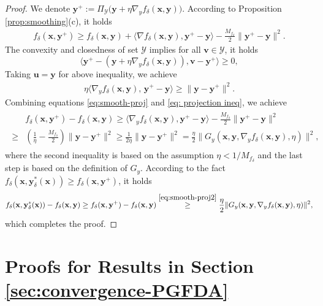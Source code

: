 \documentclass[11pt]{article}
\def\vu{\mathbf{u}}
\def\vv{\mathbf{v}}
\def\vx{\mathbf{x}}
\def\vy{\mathbf{y}}
\def\fY{{\mathcal{Y}}}
\begin{document}
\begin{proof}
We denote $\vy^+ := \Pi_{\mathcal Y}\bigl(\vy+\eta\nabla_y f_\delta(\vx,\vy)\bigr)$.
According to Proposition \ref{prop:smoothing}(c), it holds
\begin{align}\label{eq:smooth-proj}
f_\delta(\vx,\vy^+)\ge f_\delta(\vx,\vy)+\langle \nabla f_\delta(\vx,\vy),\vy^+-\vy\rangle-\frac{M_{f_\delta}}{2}\|\vy^+-\vy\|^2.    
\end{align}
The convexity and closedness of set $\fY$ implies for all $\vv\in\fY$, it holds
\begin{equation*}
\bigl\langle \vy^+ -(\vy+\eta\nabla_y f_\delta(\vx,\vy)),\vv-\vy^+\bigr\rangle \ge 0,
\end{equation*}
Taking $\vu=\vy$ for above inequality, we achieve 
\begin{align}\label{eq: projection ineq}
\eta\langle \nabla_y f_\delta(\vx,\vy),\,\vy^+-\vy\rangle \ge \|\vy-\vy^+\|^2.
\end{align}
Combining equations \eqref{eq:smooth-proj} and \eqref{eq: projection ineq}, we achieve
\begin{align}\label{eq:smooth-proj2}
\begin{split}    
& f_\delta(\vx,\vy^+)-f_\delta(\vx,\vy)\ge \langle\nabla_y f_\delta(\vx,\vy),\vy^+-\vy\rangle-\frac{M_{f_\delta}}{2}\|\vy^+-\vy\|^2 \\
\ge & \left(\frac{1}{\eta}-\frac{M_{f_\delta}}{2}\right)\|\vy-\vy^+\|^2
\ge \frac{1}{2\eta}\|\vy-\vy^+\|^2 
= \frac{\eta}{2}\|G_y(\vx,\vy,\nabla_y f_\delta(\vx,\vy),\eta)\|^2,
\end{split}
\end{align}
where the second inequality is based on the assumption $\eta<1/M_{f_\delta}$ and the last step is based on the definition of $G_y$.
According to the fact $f_\delta(\vx,\vy_\delta^*(\vx))\ge f_\delta(\vx,\vy^+)$, it holds
\begin{align*}
f_\delta(\vx,\vy_\delta^*(\vx))-f_\delta(\vx,\vy) \ge f_\delta(\vx,\vy^+)-f_\delta(\vx,\vy) \overset{\eqref{eq:smooth-proj2}}\ge \frac{\eta}{2}\|G_y(\vx,\vy,\nabla_y f_\delta(\vx,\vy),\eta)\|^2,   
\end{align*}
which completes the proof.
\end{proof}














\section{Proofs for Results in Section \ref{sec:convergence-PGFDA}}\label{Proof of Section 4}
\end{document}
